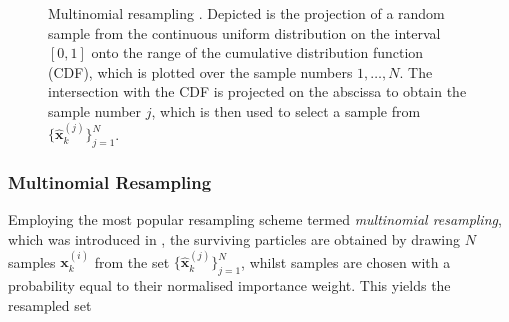 \begin{figure}
\centering
{}
\caption[A simple resampling scheme: multinomial resampling.]{Multinomial resampling \cite{merwe2000scented}. Depicted is the projection of a random sample from the continuous uniform distribution on the interval $[0, 1]$ onto the range of the cumulative distribution function (CDF), which is plotted over the sample numbers $1, \dots, N$. The intersection with the CDF is projected on the abscissa to obtain the sample number $j$, which is then used to select a sample from $\big\{\hat{\bm{x}}^{(j)}_k\big\}_{j=1}^N$.}
	\label{fig:weightes_measure_to_unweighted_measure}
\end{figure}

\subsubsection{Multinomial Resampling}

Employing the most popular resampling scheme termed \emph{multinomial resampling}, which was introduced in \cite{gordon1993novel}, the surviving particles are obtained by drawing $N$ samples $\bm{x}^{(i)}_k$ from the set $\big\{\hat{\bm{x}}^{(j)}_k\big\}_{j=1}^N$, whilst samples are chosen with a probability equal to their normalised importance weight. This yields the resampled set

